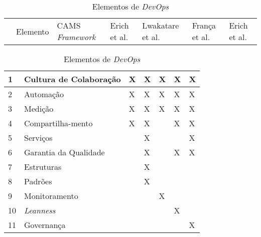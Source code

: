 \begin{table}[hb!]
\centering
\caption{Elementos de \textit{DevOps}}
\label{tabela_elementos_devops}
\begin{tabular}{|p{0.3cm}|p{2.7cm}|p{2.1cm}|p{2cm}|p{2cm}|p{2cm}|p{2cm}|}
\hline

        & Elemento               & \acrshort{CAMS} \textit{Framework} \cite{what_devops_means_2010} & Erich et al. \cite{cooperation_dev_ops_esem_2014} & Lwakatare et al. \cite{extending_dimensions} & França et al. \cite{characterizing_devops} & Erich et al. \cite{qualitative_devops_journalsw_17} \\
\end{tabular}

\begin{tabular}{|p{0.3cm}|p{2.7cm}|m{2.1cm}|m{2cm}|m{2cm}|m{2cm}|m{2cm}|}

\hline

1  & Cultura de Colaboração & X & X & X & X & X \\

\hline

2  & Automação              & X & X & X & X & X \\

\hline

3  & Medição                & X & X & X & X & X \\

\hline

4  & Compartilha-\newline mento & X & X &    & X & X \\

\hline

5  & Serviços               &        & X &        &        & X \\

\hline

6  & Garantia da Qualidade  &        & X &        & X & X \\

\hline

7  & Estruturas             &        & X &        &        &        \\

\hline

8  & Padrões                &        & X &        &        &        \\

\hline

9  & Monitoramento          &        &        & X &        &        \\

\hline

10 & \textit{Leanness}      &        &        &        & X &        \\

\hline
11 & Governança             &        &        &        &        & X \\

\hline

\end{tabular}
\end{table}

